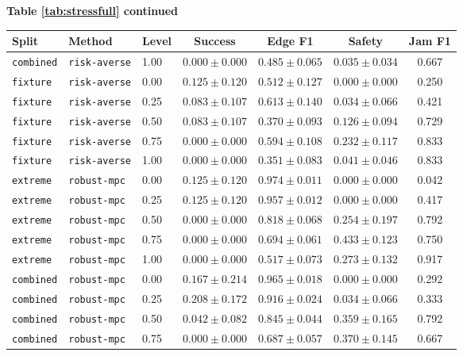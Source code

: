 \documentclass{article}
\begin{document}
\begin{center}
\textbf{Table \ref{tab:stressfull} continued}\\[0.4ex]
\begin{tabular}{lllcccc}
\toprule
Split & Method & Level & Success & Edge F1 & Safety & Jam F1 \\
\midrule
\texttt{combined} & \texttt{risk-averse} & 1.00 & $0.000 \pm 0.000$ & $0.485 \pm 0.065$ & $0.035 \pm 0.034$ & 0.667 \\
\texttt{fixture} & \texttt{risk-averse} & 0.00 & $0.125 \pm 0.120$ & $0.512 \pm 0.127$ & $0.000 \pm 0.000$ & 0.250 \\
\texttt{fixture} & \texttt{risk-averse} & 0.25 & $0.083 \pm 0.107$ & $0.613 \pm 0.140$ & $0.034 \pm 0.066$ & 0.421 \\
\texttt{fixture} & \texttt{risk-averse} & 0.50 & $0.083 \pm 0.107$ & $0.370 \pm 0.093$ & $0.126 \pm 0.094$ & 0.729 \\
\texttt{fixture} & \texttt{risk-averse} & 0.75 & $0.000 \pm 0.000$ & $0.594 \pm 0.108$ & $0.232 \pm 0.117$ & 0.833 \\
\texttt{fixture} & \texttt{risk-averse} & 1.00 & $0.000 \pm 0.000$ & $0.351 \pm 0.083$ & $0.041 \pm 0.046$ & 0.833 \\
\texttt{extreme} & \texttt{robust-mpc} & 0.00 & $0.125 \pm 0.120$ & $0.974 \pm 0.011$ & $0.000 \pm 0.000$ & 0.042 \\
\texttt{extreme} & \texttt{robust-mpc} & 0.25 & $0.125 \pm 0.120$ & $0.957 \pm 0.012$ & $0.000 \pm 0.000$ & 0.417 \\
\texttt{extreme} & \texttt{robust-mpc} & 0.50 & $0.000 \pm 0.000$ & $0.818 \pm 0.068$ & $0.254 \pm 0.197$ & 0.792 \\
\texttt{extreme} & \texttt{robust-mpc} & 0.75 & $0.000 \pm 0.000$ & $0.694 \pm 0.061$ & $0.433 \pm 0.123$ & 0.750 \\
\texttt{extreme} & \texttt{robust-mpc} & 1.00 & $0.000 \pm 0.000$ & $0.517 \pm 0.073$ & $0.273 \pm 0.132$ & 0.917 \\
\texttt{combined} & \texttt{robust-mpc} & 0.00 & $0.167 \pm 0.214$ & $0.965 \pm 0.018$ & $0.000 \pm 0.000$ & 0.292 \\
\texttt{combined} & \texttt{robust-mpc} & 0.25 & $0.208 \pm 0.172$ & $0.916 \pm 0.024$ & $0.034 \pm 0.066$ & 0.333 \\
\texttt{combined} & \texttt{robust-mpc} & 0.50 & $0.042 \pm 0.082$ & $0.845 \pm 0.044$ & $0.359 \pm 0.165$ & 0.792 \\
\texttt{combined} & \texttt{robust-mpc} & 0.75 & $0.000 \pm 0.000$ & $0.687 \pm 0.057$ & $0.370 \pm 0.145$ & 0.667 \\

\end{tabular}
\end{center}
\end{document}
